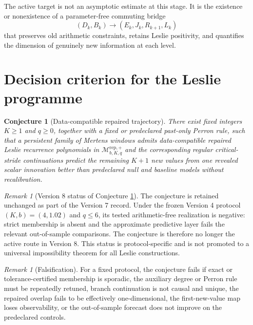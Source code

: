 \documentclass[11pt]{amsart}
\numberwithin{equation}{section}
\theoremstyle{plain}
\newtheorem{conjecture}[theorem]{Conjecture}
\theoremstyle{definition}
\theoremstyle{remark}
\newtheorem{remark}[theorem]{Remark}
\begin{document}
The active target is not an asymptotic estimate at this stage.  It is the existence or
nonexistence of a parameter-free commuting bridge
\[
(D_k,B_k)
\longrightarrow
(E_k,J_k,R_{k+1},L_k)
\]
that preserves old arithmetic constraints, retains Leslie positivity, and quantifies the
dimension of genuinely new information at each level.


\section{Decision criterion for the Leslie programme}
\label{sec:decision_criterion}

\begin{conjecture}[Data-compatible repaired trajectory]
\label{conj:transportable_trajectory_v7}
There exist fixed integers $K\geq1$ and $q\geq0$, together with a fixed or predeclared past-only Perron rule, such that a persistent family of Mertens windows admits data-compatible repaired Leslie recurrence polynomials in $\mathcal M^{\mathrm{rep},+}_{b,K,q}$ and the corresponding regular critical-stride continuations predict the remaining $K+1$ new values from one revealed scalar innovation better than predeclared null and baseline models without recalibration.
\end{conjecture}

\begin{remark}[Version 8 status of Conjecture \ref{conj:transportable_trajectory_v7}]
\label{rem:v8_status_old_conjecture}
The conjecture is retained unchanged as part of the Version 7 record.  Under the frozen
Version 4 protocol $(K,b)=(4,1.02)$ and $q\le6$, its tested arithmetic-free realization is
negative: strict membership is absent and the approximate predictive layer fails the relevant
out-of-sample comparisons.  The conjecture is therefore no longer the active route in
Version 8.  This status is protocol-specific and is not promoted to a universal impossibility
theorem for all Leslie constructions.
\end{remark}

\begin{remark}[Falsification]
\label{rem:falsification_v7}
For a fixed protocol, the conjecture fails if exact or tolerance-certified membership is sporadic, the auxiliary degree or Perron rule must be repeatedly retuned, branch continuation is not causal and unique, the repaired overlap fails to be effectively one-dimensional, the first-new-value map loses observability, or the out-of-sample forecast does not improve on the predeclared controls.
\end{remark}
\end{document}
